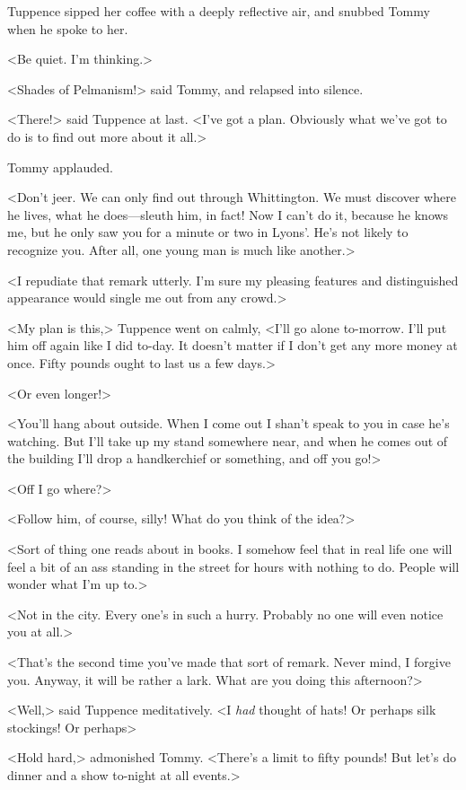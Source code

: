Tuppence sipped her coffee with a deeply reflective air, and snubbed Tommy when he spoke to her.

<Be quiet. I'm thinking.>

<Shades of Pelmanism!> said Tommy, and relapsed into silence.

<There!> said Tuppence at last. <I've got a plan. Obviously what we've got to do is to find out more about it all.>

Tommy applauded.

<Don't jeer. We can only find out through Whittington. We must discover where he lives, what he does—sleuth him, in fact! Now I can't do it, because he knows me, but he only saw you for a minute or two in Lyons'. He's not likely to recognize you. After all, one young man is much like another.>

<I repudiate that remark utterly. I'm sure my pleasing features and distinguished appearance would single me out from any crowd.>

<My plan is this,> Tuppence went on calmly, <I'll go alone to-morrow. I'll put him off again like I did to-day. It doesn't matter if I don't get any more money at once. Fifty pounds ought to last us a few days.>

<Or even longer!>

<You'll hang about outside. When I come out I shan't speak to you in case he's watching. But I'll take up my stand somewhere near, and when he comes out of the building I'll drop a handkerchief or something, and off you go!>

<Off I go where?>

<Follow him, of course, silly! What do you think of the idea?>

<Sort of thing one reads about in books. I somehow feel that in real life one will feel a bit of an ass standing in the street for hours with nothing to do. People will wonder what I'm up to.>

<Not in the city. Every one's in such a hurry. Probably no one will even notice you at all.>

<That's the second time you've made that sort of remark. Never mind, I forgive you. Anyway, it will be rather a lark. What are you doing this afternoon?>

<Well,> said Tuppence meditatively. <I \emph{had} thought of hats! Or perhaps silk stockings! Or perhaps\longdash>

<Hold hard,> admonished Tommy. <There's a limit to fifty pounds! But let's do dinner and a show to-night at all events.>

